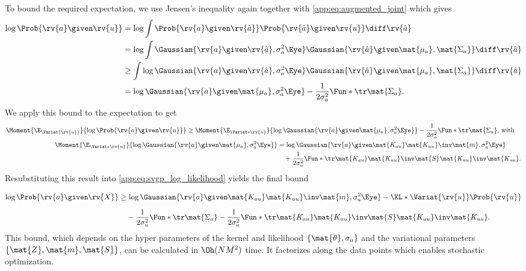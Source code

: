 \documentclass{article}
\begin{document}
To bound the required expectation, we use Jensen's inequality again together with \cref{app:eq:augmented_joint} which gives
\begin{align}
\label{app:eq:svgp_log_marginal_likelihood}
\begin{split}
    \log\Prob{\rv{a} \given \rv{u}}
    &= \log\int \Prob{\rv{a} \given \rv{\hat{a}}} \Prob{\rv{\hat{a}} \given \rv{u}} \diff \rv{\hat{a}} \\
    &= \log\int \Gaussian{\rv{a} \given \rv{\hat{a}}, \sigma_a^2 \Eye} \Gaussian{\rv{\hat{a}} \given \mat{\mu_a}, \mat{\Sigma_a}} \diff \rv{\hat{a}} \\
    &\geq \int \log\Gaussian{\rv{a} \given \rv{\hat{a}}, \sigma_a^2 \Eye} \Gaussian{\rv{\hat{a}} \given \mat{\mu_a}, \mat{\Sigma_a}} \diff \rv{\hat{a}} \\
    &= \log\Gaussian{\rv{a} \given \mat{\mu_a}, \sigma_a^2 \Eye} - \frac{1}{2\sigma_a^2}\Fun*{\tr}{\mat{\Sigma_a}}.
\end{split}
\end{align}
We apply this bound to the expectation to get
\begin{align}
\begin{split}
    \Moment{\E_{\Variat{\rv{u}}}}{\log \Prob{\rv{a} \given \rv{u}}}
    &\geq \Moment{\E_{\Variat*{\rv{u}}}}{\log\Gaussian{\rv{a} \given \mat{\mu_a}, \sigma_a^2 \Eye}}
    - \frac{1}{2\sigma_a^2} \Fun*{\tr}{\mat{\Sigma_a}}\text{, with}
\end{split} \\
\begin{split}
    \Moment{\E_{\Variat*{\rv{u}}}}{\log\Gaussian{\rv{a} \given \mat{\mu_a}, \sigma_a^2 \Eye}}
    &= \log \Gaussian{\rv{a} \given \mat{K_{au}}\mat{K_{uu}}\inv\mat{m}, \sigma_a^2 \Eye} \\
    &\quad {} + \frac{1}{2\sigma_a^2}\Fun*{\tr}{\mat{K_{au}}\mat{K_{uu}}\inv\mat{S}\mat{K_{uu}}\inv\mat{K_{ua}}}.
\end{split}
\end{align}
Resubstituting this result into \cref{app:eq:svgp_log_likelihood} yields the final bound
\begin{align}
\label{app:eq:svgp_bound}
\begin{split}
    \log \Prob{\rv{a} \given \rv{X}}
    &\geq \log \Gaussian{\rv{a} \given \mat{K_{au}}\mat{K_{uu}}\inv\mat{m}, \sigma_a^2 \Eye}
    - \vphantom{\frac{1}{2\sigma_a^2}} \KL*{\Variat{\rv{u}}}{\Prob{\rv{u}}} \\
    &\quad {} - \frac{1}{2\sigma_a^2} \Fun*{\tr}{\mat{\Sigma_a}}
    - \frac{1}{2\sigma_a^2} \Fun*{\tr}{\mat{K_{au}}\mat{K_{uu}}\inv\mat{S}\mat{K_{uu}}\inv\mat{K_{ua}}}.
\end{split}
\end{align}
This bound, which depends on the hyper parameters of the kernel and likelihood $\left\{ \mat{\theta}, \sigma_a \right\}$ and the variational parameters $\left\{\mat{Z}, \mat{m}, \mat{S} \right\}$, can be calculated in $\Oh(NM^2)$ time.
It factorizes along the data points which enables stochastic optimization.
\end{document}
